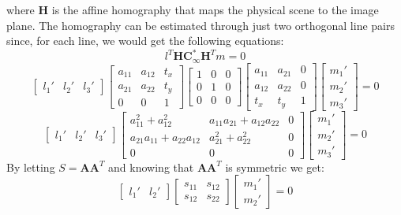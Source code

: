 \documentclass{article}
\begin{document}
where $\boldsymbol{H}$ is the affine homography that maps the physical scene to the image plane. The homography can be estimated through just two orthogonal line pairs since, for each line, we would get the following equations:
\[l^T \boldsymbol{H} \boldsymbol{C_\infty^{*}} \boldsymbol{H}^T m = 0\]
\[\begin{bmatrix}
    l_1 ' & l_2 ' & l_3 '
\end{bmatrix} \begin{bmatrix}
    a_{11} & a_{12} & t_x \\
    a_{21} & a_{22} & t_y \\
    0 & 0 & 1
\end{bmatrix} \begin{bmatrix}
    1 & 0 & 0 \\ 
    0 & 1 & 0 \\
    0 & 0 & 0
\end{bmatrix} \begin{bmatrix}
    a_{11} & a_{21} & 0 \\
    a_{12} & a_{22} & 0 \\
    t_x & t_y & 1
\end{bmatrix} \begin{bmatrix}
    m_1 ' \\ m_2 ' \\ m_3 '
\end{bmatrix} = 0\]
\[\begin{bmatrix}
    l_1 ' & l_2 ' & l_3 '
\end{bmatrix} \begin{bmatrix}
    a_{11}^2 + a_{12}^2 & a_{11} a_{21} + a_{12} a_{22} & 0\\
    a_{21} a_{11} + a_{22} a_{12} & a_{21}^2 + a_{22}^2 & 0\\
    0 & 0 & 0 
\end{bmatrix} \begin{bmatrix}
    m_1 ' \\ m_2 ' \\ m_3 '
\end{bmatrix} = 0\]
By letting $S = \boldsymbol{A} \boldsymbol{A}^T$ and knowing that $\boldsymbol{A} \boldsymbol{A}^T$ is symmetric we get:
\[\begin{bmatrix}
    l_1 ' & l_2 '
\end{bmatrix} \begin{bmatrix}
    s_{11} & s_{12} \\
    s_{12} & s_{22}
\end{bmatrix} \begin{bmatrix}
    m_1 ' \\ m_2 '
\end{bmatrix} = 0\]
\end{document}
